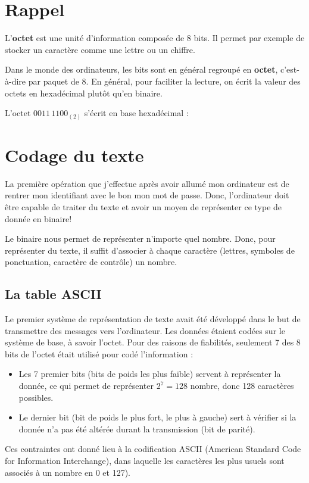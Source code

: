 

\vspace{-1cm}
\section{Rappel}
\vspace{-0.5cm}
\begin{mydefinition}
	L'{\bf octet} est une unité d'information composée de 8 bits. Il permet par exemple de stocker un caractère comme une lettre ou un chiffre.
\end{mydefinition}
Dans le monde des ordinateurs, les bits sont en général regroupé en \textbf{octet}, c'est-à-dire par paquet de 8. En général, pour faciliter la lecture, on écrit la valeur des octets en hexadécimal plutôt qu'en binaire.
\begin{myexample}
	L'octet  $0011\,1100_{(2)}$ s'écrit en base hexadécimal :
	\vspace{1cm}
	
\end{myexample}


\section{Codage du texte}
La première opération que j'effectue après avoir allumé mon ordinateur est de rentrer mon identifiant avec le bon mon mot de passe. Donc, l'ordinateur doit être capable de traiter du texte et avoir un moyen de représenter ce type de donnée en binaire!

Le binaire nous permet de représenter n'importe quel nombre. Donc, pour représenter du texte, il suffit d'associer à chaque caractère (lettres, symboles de ponctuation, caractère de contrôle) un nombre. 
\subsection{La table ASCII}
  Le premier système de représentation de texte avait été développé dans le but de transmettre des messages vers l'ordinateur. Les données étaient codées sur le système de base, à savoir l'octet. Pour des raisons de fiabilités, seulement 7 des 8 bits de l'octet était utilisé pour codé l'information : 
  \begin{itemize}
  	\item Les 7 premier bits (bits de poids les plus faible) servent à représenter la donnée, ce qui permet de représenter $2^7=128$ nombre, donc 128 caractères possibles. 
  	\item Le dernier bit (bit de poids le plus fort, le plus à gauche) sert à vérifier si la donnée n'a pas été altérée durant la transmission (bit de parité).
  \end{itemize}
  Ces contraintes ont donné lieu à la codification ASCII (American Standard Code for Information Interchange), dans laquelle les caractères les plus usuels sont associés à un nombre en 0 et 127).
   
